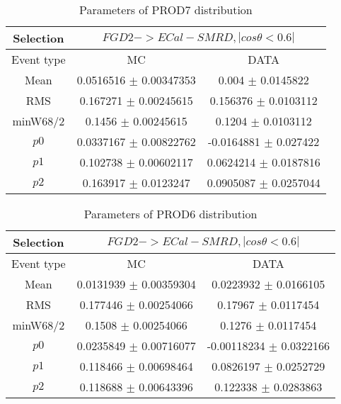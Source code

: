 \documentclass[a4paper,12pt]{article}
\begin{document}
\begin{table}[htbp]
\begin{center}
\begin{tabular}{|c|c|c|}
        \hline
        Selection & \multicolumn{2}{|c|}{$FGD2->ECal-SMRD, |cos\theta<0.6|$}  \\ \hline
        Event type & MC & DATA \\ 
        \hline
        Mean & 0.0516516 $\pm$ 0.00347353 & 0.004 $\pm$ 0.0145822 \\ 
        \hline 
        RMS & 0.167271 $\pm$ 0.00245615 & 0.156376 $\pm$ 0.0103112 \\ 
        \hline 
        minW68/2 & 0.1456 $\pm$ 0.00245615 & 0.1204 $\pm$ 0.0103112 \\ 
        \hline 
        $p0$ & 0.0337167 $\pm$ 0.00822762 & -0.0164881 $\pm$ 0.027422 \\ 
        \hline 
        $p1$ & 0.102738 $\pm$ 0.00602117 & 0.0624214 $\pm$ 0.0187816 \\ 
        \hline 
        $p2$ & 0.163917 $\pm$ 0.0123247 & 0.0905087 $\pm$ 0.0257044 \\ 
        \hline 
\end{tabular}
\caption{Parameters of PROD7 distribution } \vspace{0.2in}
\label{xxx}
\end{center}
\end{table}
\begin{table}[htbp]
\begin{center}
\begin{tabular}{|c|c|c|}
        \hline
        Selection & \multicolumn{2}{|c|}{$FGD2->ECal-SMRD, |cos\theta<0.6|$}  \\ \hline
        Event type & MC & DATA \\ 
        \hline
        Mean & 0.0131939 $\pm$ 0.00359304 & 0.0223932 $\pm$ 0.0166105 \\ 
        \hline 
        RMS & 0.177446 $\pm$ 0.00254066 & 0.17967 $\pm$ 0.0117454 \\ 
        \hline 
        minW68/2 & 0.1508 $\pm$ 0.00254066 & 0.1276 $\pm$ 0.0117454 \\ 
        \hline 
        $p0$ & 0.0235849 $\pm$ 0.00716077 & -0.00118234 $\pm$ 0.0322166 \\ 
        \hline 
        $p1$ & 0.118466 $\pm$ 0.00698464 & 0.0826197 $\pm$ 0.0252729 \\ 
        \hline 
        $p2$ & 0.118688 $\pm$ 0.00643396 & 0.122338 $\pm$ 0.0283863 \\ 
        \hline 
\end{tabular}
\caption{Parameters of PROD6 distribution } \vspace{0.2in}
\label{xxx}
\end{center}
\end{table}
\end{document}
